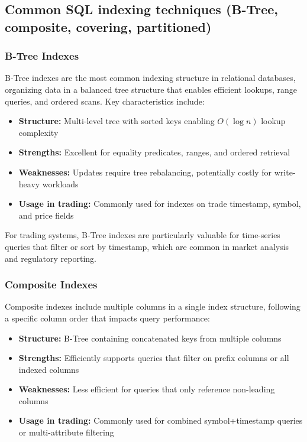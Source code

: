 \documentclass[11pt,a4paper]{article}
\begin{document}
\subsection{Common SQL indexing techniques (B-Tree, composite, covering, partitioned)}

\subsubsection{B-Tree Indexes}

B-Tree indexes are the most common indexing structure in relational databases, organizing data in a balanced tree structure that enables efficient lookups, range queries, and ordered scans. Key characteristics include:

\begin{itemize}
    \item \textbf{Structure:} Multi-level tree with sorted keys enabling $O(\log n)$ lookup complexity
    \item \textbf{Strengths:} Excellent for equality predicates, ranges, and ordered retrieval
    \item \textbf{Weaknesses:} Updates require tree rebalancing, potentially costly for write-heavy workloads
    \item \textbf{Usage in trading:} Commonly used for indexes on trade timestamp, symbol, and price fields
\end{itemize}

For trading systems, B-Tree indexes are particularly valuable for time-series queries that filter or sort by timestamp, which are common in market analysis and regulatory reporting.

\subsubsection{Composite Indexes}

Composite indexes include multiple columns in a single index structure, following a specific column order that impacts query performance:

\begin{itemize}
    \item \textbf{Structure:} B-Tree containing concatenated keys from multiple columns
    \item \textbf{Strengths:} Efficiently supports queries that filter on prefix columns or all indexed columns
    \item \textbf{Weaknesses:} Less efficient for queries that only reference non-leading columns
    \item \textbf{Usage in trading:} Commonly used for combined symbol+timestamp queries or multi-attribute filtering
\end{itemize}
\end{document}
